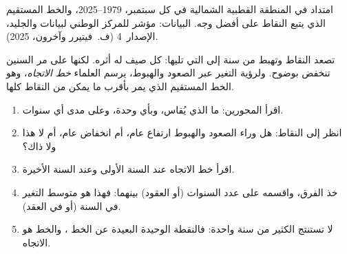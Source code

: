 \begin{omfigure}

{\small امتداد  في المنطقة القطبية الشمالية في كل سبتمبر،
1979--2025، والخط المستقيم الذي يتبع النقاط على أفضل وجه. البيانات: مؤشر
 للمركز الوطني لبيانات  والجليد، الإصدار~4 (ف.~فيتيرر
وآخرون، 2025).}
\label{fig:g8:ice-on-earth:sea-ice}
\end{omfigure}

تصعد النقاط وتهبط من سنة إلى التي تليها:  كل صيف له أثره. لكنها على مر
السنين تنخفض بوضوح. ولرؤية التغير عبر الصعود والهبوط، يرسم العلماء \emph{خط
الاتجاه}، وهو الخط المستقيم الذي يمر بأقرب ما يمكن من النقاط
كلها.

\begin{method}
\begin{enumerate}
  \item اقرأ المحورين: ما الذي يُقاس، وبأي وحدة، وعلى مدى أي سنوات.
  \item انظر إلى النقاط: هل وراء الصعود والهبوط ارتفاع عام، أم انخفاض
        عام، أم لا هذا ولا ذاك؟
  \item اقرأ خط الاتجاه عند السنة الأولى وعند السنة الأخيرة.
  \item خذ الفرق، واقسمه على عدد السنوات (أو العقود) بينهما: فهذا هو
        متوسط التغير في السنة (أو في العقد).
  \item لا تستنتج الكثير من سنة واحدة: فالنقطة الوحيدة البعيدة عن
        الخط ، والخط هو الاتجاه.
\end{enumerate}
\end{method}


